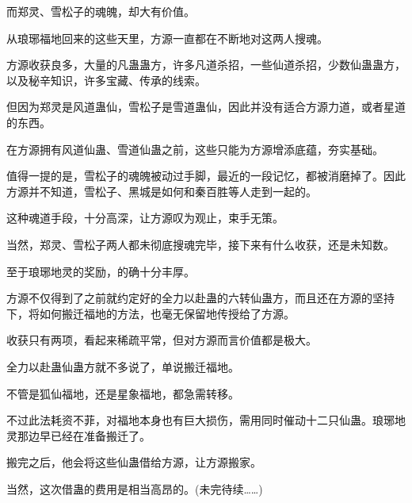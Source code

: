 \begin{this_body}
而郑灵、雪松子的魂魄，却大有价值。

从琅琊福地回来的这些天里，方源一直都在不断地对这两人搜魂。

方源收获良多，大量的凡蛊蛊方，许多凡道杀招，一些仙道杀招，少数仙蛊蛊方，以及秘辛知识，许多宝藏、传承的线索。

但因为郑灵是风道蛊仙，雪松子是雪道蛊仙，因此并没有适合方源力道，或者星道的东西。

在方源拥有风道仙蛊、雪道仙蛊之前，这些只能为方源增添底蕴，夯实基础。

值得一提的是，雪松子的魂魄被动过手脚，最近的一段记忆，都被消磨掉了。因此方源并不知道，雪松子、黑城是如何和秦百胜等人走到一起的。

这种魂道手段，十分高深，让方源叹为观止，束手无策。

当然，郑灵、雪松子两人都未彻底搜魂完毕，接下来有什么收获，还是未知数。

至于琅琊地灵的奖励，的确十分丰厚。

方源不仅得到了之前就约定好的全力以赴蛊的六转仙蛊方，而且还在方源的坚持下，将如何搬迁福地的方法，也毫无保留地传授给了方源。

收获只有两项，看起来稀疏平常，但对方源而言价值都是极大。

全力以赴蛊仙蛊方就不多说了，单说搬迁福地。

不管是狐仙福地，还是星象福地，都急需转移。

不过此法耗资不菲，对福地本身也有巨大损伤，需用同时催动十二只仙蛊。琅琊地灵那边早已经在准备搬迁了。

搬完之后，他会将这些仙蛊借给方源，让方源搬家。

当然，这次借蛊的费用是相当高昂的。(未完待续……)

\end{this_body}

